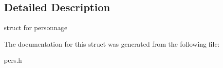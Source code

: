 \subsection{Detailed Description}
struct for personnage 

The documentation for this struct was generated from the following file\+:\begin{DoxyCompactItemize}
\item 
pers.\+h\end{DoxyCompactItemize}
